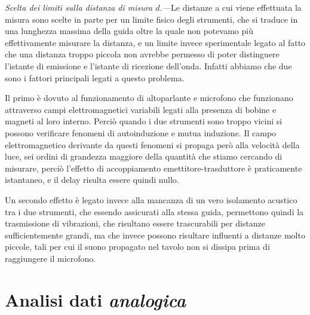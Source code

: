\documentclass[
    rmp,
    reprint, 
    superscriptaddress, 
    altaffilletter, 
    amsmath, 
    amssymb, 
    a4paper,
    varvw]{revtex4-2}
\begin{document}
\textit{Scelta dei limiti sulla distanza di misura $d$.---}Le distanze a cui viene effettuata la misura sono scelte in parte per un limite fisico degli strumenti, che si traduce in una lunghezza massima della guida oltre la quale non potevamo più effettivamente misurare la distanza, e un limite invece sperimentale legato al fatto che una distanza troppo piccola non avrebbe permesso di poter distinguere l'istante di emissione e l'istante di ricezione dell'onda. Infatti abbiamo che due sono i fattori principali legati a questo problema. 

Il primo è dovuto al funzionamento di altoparlante e microfono che funzionano attraverso campi elettromagnetici variabili legati alla presenza di bobine e magneti al loro interno. Perciò quando i due strumenti sono troppo vicini si possono verificare fenomeni di autoinduzione e mutua induzione. Il campo elettromagnetico derivante da questi fenomeni si propaga però alla velocità della luce, sei ordini di grandezza maggiore della quantità che stiamo cercando di misurare, perciò l'effetto di accoppiamento emettitore-trasduttore è praticamente istantaneo, e il delay risulta essere quindi nullo. 

Un secondo effetto è legato invece alla mancanza di un vero isolamento acustico tra i due strumenti, che essendo assicurati alla stessa guida, permettono quindi la trasmissione di vibrazioni, che risultano essere trascurabili per distanze sufficientemente grandi, ma che invece possono risultare influenti a distanze molto piccole, tali per cui il suono propagato nel tavolo non si dissipa prima di raggiungere il microfono. 

\section{Analisi dati \emph{analogica}}
\end{document}
